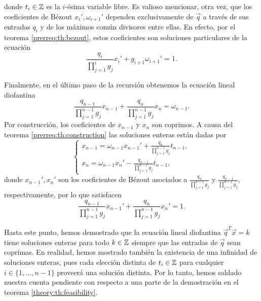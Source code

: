 donde $t_i \in \mathbb{Z}$ es la $i$-ésima variable libre. Es valioso mencionar, otra vez, que los
coeficientes de Bézout $x_i', \omega_{i+1}'$ dependen exclusivamente de $\vec{q}$ a través de sus
entradas $q_i$ y de los máximos común divisores entre ellas. En efecto, por el teorema
\ref{prerreq:th:bezout}, estos coeficientes son soluciones particulares de la ecuación
\begin{equation}
	\label{dummy:eq:bez-eq}
	\frac{q_i}{\prod_{j=1}^{i}g_j}x_i' + g_{i+1}\omega_{i+1}' = 1.
\end{equation}

Finalmente, en el último paso de la recursión obtenemos la ecuación lineal diofantina
\begin{equation}
	\label{eq:last-equation}
	\frac{q_{n-1}}{\prod_{j=1}^{n-1}g_j}x_{n-1} +
	\frac{q_{n}}{\prod_{j=1}^{n-1}g_j}x_n
	= \omega_{n-1}.
\end{equation}
Por construcción, los coeficientes de $x_{n - 1}$ y $x_n$ son coprimos. A causa del teorema
\ref{prerreq:th:construction} las soluciones enteras están dadas por
\begin{equation}
	\label{eq:last-solution}
	\begin{cases}
		x_{n-1} = \omega_{n-1}x_{n-1}' + \frac{q_n}{\prod_{j=1}^{n-1}g_j}t_{n-1}, \\
		x_n = \omega_{n-1}x_n' - \frac{q_{n-1}}{\prod_{j=1}^{n-1}g_j}t_{n-1},
	\end{cases}
\end{equation}
donde $x_{n-1}', x_n'$ son los coeficientes de Bézout asociados a
$\frac{q_n}{\prod_{j=1}^{n-1}g_j}$ y $\frac{q_{n-1}}{\prod_{j=1}^{n-1}g_j}$,
respectivamente, por lo que satisfacen
\begin{equation}
	\label{eq:last-equation-bez}
	\frac{q_{n-1}}{\prod_{j=1}^{n-1}g_j}x_{n-1}' +
	\frac{q_{n}}{\prod_{j=1}^{n-1}g_j}x_n'
	= 1.
\end{equation}

Hasta este punto, hemos demostrado que la ecuación lineal diofantina $\vec{q}^T\vec{x} = k$ tiene
soluciones enteras para todo $k \in \mathbb{Z}$ siempre que las entradas de $\vec{q}$ sean coprimas. En
realidad, hemos mostrado también la existencia de una infinidad de soluciones enteras, pues cada
elección distinta de $t_i \in \mathbb{Z}$ para cualquier $i \in \lbrace 1, \ldots, n - 1\rbrace$ proveerá una
solución distinta. Por lo tanto, hemos saldado nuestra cuenta pendiente con respecto a una parte de
la demostración en el teorema \ref{theory:th:feasibility}.

